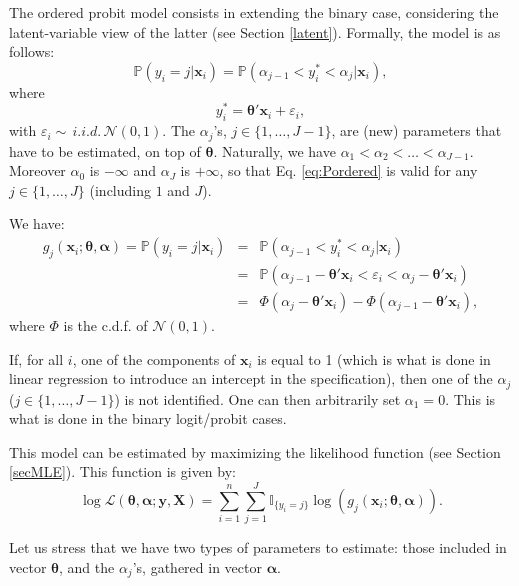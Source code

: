 \documentclass[
  12pt,
]{book}
\theoremstyle{definition}
\theoremstyle{definition}
\theoremstyle{definition}
\theoremstyle{definition}
\theoremstyle{remark}
\begin{document}
The ordered probit model consists in extending the binary case, considering the latent-variable view of the latter (see Section \ref{latent}). Formally, the model is as follows:
\begin{equation}
\mathbb{P}(y_i = j | \mathbf{x}_i) = \mathbb{P}(\alpha_{j-1} <y^*_i < \alpha_{j} |\mathbf{x}_i), \label{eq:Pordered}
\end{equation}
where
\[
y_{i}^* = \boldsymbol\theta'\mathbf{x}_i + \varepsilon_i,
\]
with \(\varepsilon_i \sim \,i.i.d.\,\mathcal{N}(0,1)\). The \(\alpha_j\)'s, \(j \in \{1,\dots,J-1\}\), are (new) parameters that have to be estimated, on top of \(\boldsymbol\theta\). Naturally, we have \(\alpha_1<\alpha_2<\dots<\alpha_{J-1}\). Moreover \(\alpha_0\) is \(- \infty\) and \(\alpha_J\) is \(+ \infty\), so that Eq. \eqref{eq:Pordered} is valid for any \(j \in \{1,\dots,J\}\) (including \(1\) and \(J\)).

We have:
\begin{eqnarray*}
g_j(\mathbf{x}_i;\boldsymbol\theta,\boldsymbol\alpha) = \mathbb{P}(y_i = j | \mathbf{x}_i) &=& \mathbb{P}(\alpha_{j-1} <y^*_i < \alpha_{j} |\mathbf{x}_i) \\
&=& \mathbb{P}(\alpha_{j-1} - \boldsymbol\theta'\mathbf{x}_i  <\varepsilon_i < \alpha_{j} - \boldsymbol\theta'\mathbf{x}_i) \\
&=& \Phi(\alpha_{j} - \boldsymbol\theta'\mathbf{x}_i) - \Phi(\alpha_{j-1} - \boldsymbol\theta'\mathbf{x}_i),
\end{eqnarray*}
where \(\Phi\) is the c.d.f. of \(\mathcal{N}(0,1)\).

If, for all \(i\), one of the components of \(\mathbf{x}_i\) is equal to 1 (which is what is done in linear regression to introduce an intercept in the specification), then one of the \(\alpha_j\) (\(j\in\{1,\dots,J-1\}\)) is not identified. One can then arbitrarily set \(\alpha_1=0\). This is what is done in the binary logit/probit cases.

This model can be estimated by maximizing the likelihood function (see Section \ref{secMLE}). This function is given by:
\begin{equation}
\log \mathcal{L}(\boldsymbol\theta,\boldsymbol\alpha;\mathbf{y},\mathbf{X}) = \sum_{i=1}^n  \sum_{j=1}^J \mathbb{I}_{\{y_i=j\}} \log \left(g_j(\mathbf{x}_i;\boldsymbol\theta,\boldsymbol\alpha)\right). \label{eq:multipleLogLik}
\end{equation}

Let us stress that we have two types of parameters to estimate: those included in vector \(\boldsymbol\theta\), and the \(\alpha_j\)'s, gathered in vector \(\boldsymbol\alpha\).
\end{document}
